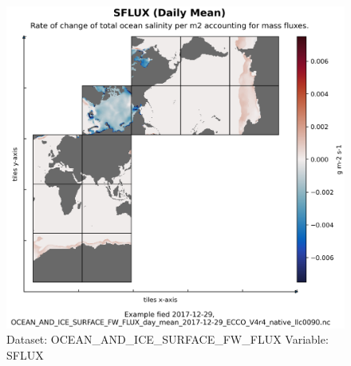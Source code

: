 \begin{figure}[H]
\centering
\includegraphics[width=\textwidth]{../images/plots/native_plots/Ocean_and_Sea-Ice_Surface_Freshwater_Fluxes/SFLUX.png}
\caption{Dataset: OCEAN\_AND\_ICE\_SURFACE\_FW\_FLUX Variable: SFLUX}
\label{tab:table-OCEAN_AND_ICE_SURFACE_FW_FLUX_SFLUX-Plot}
\end{figure}
\pagebreak
